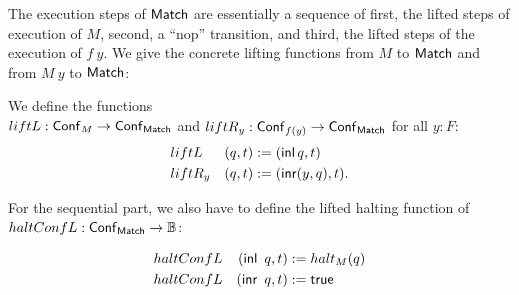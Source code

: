 The execution steps of $\mathsf{Match}$ are essentially a sequence of first, the lifted steps of execution of $M$, second, a ``nop'' transition, and third,
the lifted steps of the execution of $f~y$.  We give the concrete lifting functions from $M$ to $\mathsf{Match}$ and from $M~y$ to $\mathsf{Match}$:
%
\begin{definition}
  We define the functions \\$liftL : \mathsf{Conf}_M \rightarrow \mathsf{Conf}_{\mathsf{Match}}$ and $liftR_y : \mathsf{Conf}_{f(y)} \rightarrow \mathsf{Conf}_{\mathsf{Match}}$ for all $y:F$:
  \begin{alignat*}{2}
    & liftL   & (q, t) &:= (\operatorname{\mathsf{inl}} q,      t) \\
    & liftR_y & (q, t) &:= (\operatorname{\mathsf{inr}} (y, q), t).
  \end{alignat*}
\end{definition}

For the sequential part, we also have to define the lifted halting function of \\$haltConfL : \mathsf{Conf}_{\mathsf{Match}} \rightarrow \mathbb{B}$:
\begin{definition}
  \begin{alignat*}{2}
    & haltConfL & (\operatorname{\mathsf{inl}}~q, t) &:= halt_M(q) \\
    & haltConfL & (\operatorname{\mathsf{inr}}~q, t) &:= \mathsf{true}
  \end{alignat*}
\end{definition}

